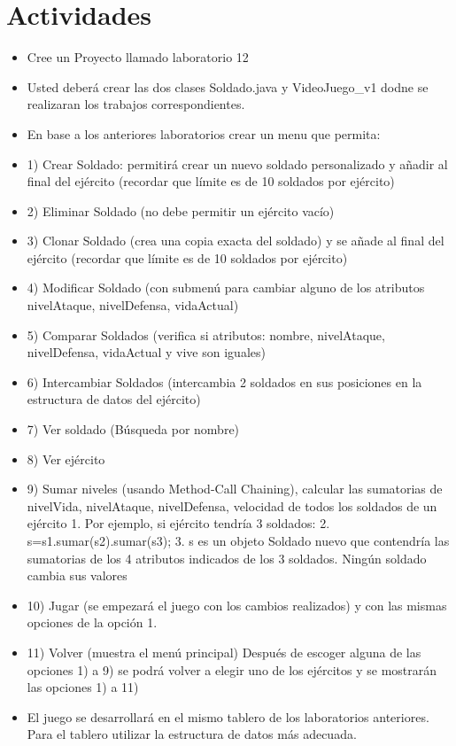 \documentclass{article}
\begin{document}
	\section{Actividades}
	\begin{itemize}		
		\item Cree un Proyecto llamado laboratorio 12
		\item Usted deberá crear las dos clases Soldado.java y VideoJuego_v1 dodne se realizaran los trabajos correspondientes.
		\item En base a los anteriores laboratorios crear un menu que permita:
		\item  1) Crear Soldado: permitirá crear un nuevo soldado personalizado
y añadir al final del ejército (recordar que límite es de 10
soldados por ejército)
\item  2) Eliminar Soldado (no debe permitir un ejército vacío)
\item  3) Clonar Soldado (crea una copia exacta del soldado) y se añade
al final del ejército (recordar que límite es de 10 soldados por
ejército)
\item  4) Modificar Soldado (con submenú para cambiar alguno de los
atributos nivelAtaque, nivelDefensa, vidaActual)
\item  5) Comparar Soldados (verifica si atributos: nombre, nivelAtaque,
nivelDefensa, vidaActual y vive son iguales)
\item  6) Intercambiar Soldados (intercambia 2 soldados en sus posiciones
en la estructura de datos del ejército)
\item  7) Ver soldado (Búsqueda por nombre)
\item  8) Ver ejército
\item  9) Sumar niveles (usando Method-Call Chaining), calcular las
sumatorias de nivelVida, nivelAtaque, nivelDefensa, velocidad de
todos los soldados de un ejército
1. Por ejemplo, si ejército tendría 3 soldados:
2. s=s1.sumar(s2).sumar(s3);
3. s es un objeto Soldado nuevo que contendría las
sumatorias de los 4 atributos indicados de los 3 soldados.
Ningún soldado cambia sus valores

\item  10) Jugar (se empezará el juego con los cambios realizados) y con
las mismas opciones de la opción 1.
\item  11) Volver (muestra el menú principal)
Después de escoger alguna de las opciones 1) a 9) se podrá volver a
elegir uno de los ejércitos y se mostrarán las opciones 1) a 11)
		
\item El juego se desarrollará en el mismo tablero de los laboratorios anteriores. Para el tablero
utilizar la estructura de datos más adecuada.


	
	\end{itemize}
		
\end{document}
